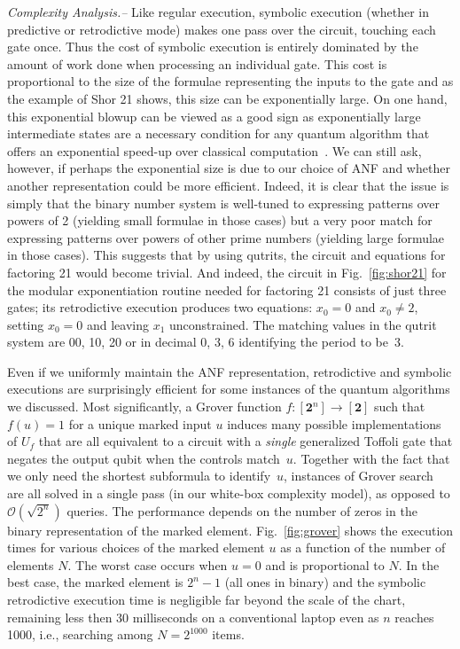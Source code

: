 \documentclass[aps,prl,twocolumn,superscriptaddress,floatfix,notitlepage]{revtex4-2}
\newcommand{\finset}[1]{[\mathbf{#1}]}
\begin{document}
{\it Complexity Analysis.--} 
Like regular execution, symbolic execution (whether in predictive or retrodictive mode) makes one pass over the circuit, touching 
each gate once. Thus the cost of symbolic execution is entirely dominated by the amount of work
done when processing an individual gate. This cost is proportional to the size of the formulae representing the inputs to the gate and as the example of Shor 21 shows, this size can be exponentially large. On one hand, this
exponential blowup can be viewed as a good sign as exponentially large intermediate states are a necessary condition for any quantum
algorithm that offers an exponential speed-up over classical
computation~\cite{10.2307/3560059}. We can still ask, however, if perhaps the exponential size is due to our choice of ANF and whether another representation could be more efficient. Indeed, it is clear that the issue is simply that the
binary number system is well-tuned to expressing patterns over powers
of 2 (yielding small formulae in those cases) but a very poor match for expressing patterns over powers of other prime numbers 
(yielding large formulae in those cases). This suggests that by using qutrits, the circuit and
equations for factoring 21 would become trivial. And indeed, the circuit in
Fig.~\ref{fig:shor21} for the modular exponentiation routine needed for factoring 21 consists of just three gates; its retrodictive
execution produces two equations: $x_0=0$ and $x_0 \neq 2$, setting
$x_0=0$ and leaving $x_1$ unconstrained. The matching values in the
qutrit system are 00, 10, 20 or in decimal 0, 3, 6 identifying
the period to be~3.

Even if we uniformly maintain the ANF representation, retrodictive and symbolic executions are surprisingly efficient for some instances of the quantum algorithms we discussed. Most significantly, a Grover function $f : \finset{2^\mathit{n}} \rightarrow \finset{2}$ such that $f(u) = 1$ for a unique marked input $u$ induces many possible implementations of $U_f$ that are all equivalent to a circuit with a \emph{single} generalized Toffoli gate that negates the output qubit when the controls match~$u$. Together with the fact that we only need the shortest subformula to identify~$u$, instances of Grover search are all solved in a single pass (in our white-box complexity model), as opposed to $\mathcal{O}(\sqrt{2^n})$ queries. The performance depends on the number of zeros in the binary representation of the marked element.  Fig.~\ref{fig:grover} shows the execution times for various choices of the marked element $u$ as a function of the number of elements $N$. The worst case occurs when $u=0$ and is proportional to $N$. In the best case, the marked element is $2^n-1$ (all ones in binary) and the symbolic retrodictive execution time is negligible far beyond the scale of the chart, remaining less then 30 milliseconds on a conventional laptop even as $n$ reaches 1000, i.e., searching among $N=2^{1000}$ items. 
\end{document}
